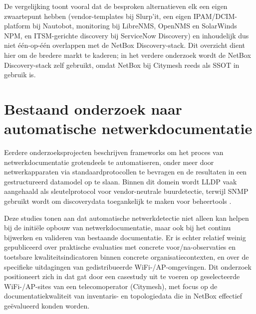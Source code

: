 De vergelijking toont vooral dat de besproken alternatieven elk een eigen zwaartepunt hebben (vendor-templates bij Slurp'it, een eigen IPAM/DCIM-platform bij Nautobot, monitoring bij LibreNMS, OpenNMS en SolarWinds NPM, en ITSM-gerichte discovery bij ServiceNow Discovery) en inhoudelijk dus niet \'e\'en-op-\'e\'en overlappen met de NetBox Discovery-stack. Dit overzicht dient hier om de bredere markt te kaderen; in het verdere onderzoek wordt de NetBox Discovery-stack zelf gebruikt, omdat NetBox bij Citymesh reeds als SSOT in gebruik is.

\section{Bestaand onderzoek naar automatische netwerkdocumentatie}

Eerdere onderzoeksprojecten beschrijven frameworks om het proces van netwerkdocumentatie grotendeels te automatiseren, onder meer door netwerkapparaten via standaardprotocollen te bevragen en de resultaten in een gestructureerd datamodel op te slaan. Binnen dit domein wordt LLDP vaak aangehaald als sleutelprotocol voor vendor-neutrale buurdetectie, terwijl SNMP gebruikt wordt om discoverydata toegankelijk te maken voor beheertools \autocite{SnmpTopologyDiscoveryIEEE2013,LLDP_IJCA}.

Deze studies tonen aan dat automatische netwerkdetectie niet alleen kan helpen bij de initi\"ele opbouw van netwerkdocumentatie, maar ook bij het continu bijwerken en valideren van bestaande documentatie. Er is echter relatief weinig gepubliceerd over praktische evaluaties met concrete voor/na-observaties en toetsbare kwaliteitsindicatoren binnen concrete organisatiecontexten, en over de specifieke uitdagingen van gedistribueerde WiFi-/AP-omgevingen. Dit onderzoek positioneert zich in dat gat door een casestudy uit te voeren op geselecteerde WiFi-/AP-sites van een telecomoperator (Citymesh), met focus op de documentatiekwaliteit van inventaris- en topologiedata die in NetBox effectief geëvalueerd konden worden.
